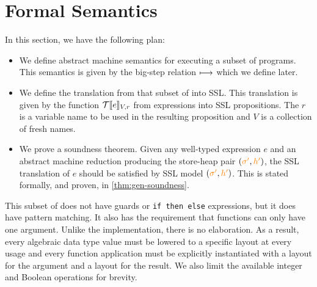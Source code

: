 \section{Formal Semantics}
\label{sec:semantics}



In this section, we have the following plan:

\begin{itemize}
  \item We define abstract machine semantics for executing a subset of \tool programs. This semantics
    is given by the big-step relation $\longmapsto$ which we define later.
  \item We define the translation from that subset of \tool into SSL. This translation is given by the
    function $\mathcal{T}\llbracket e\rrbracket_{V,r}$ from \tool expressions into SSL propositions. The $r$ is a variable name to
    be used in the resulting proposition and $V$ is a collection of fresh names.
  \item We prove a soundness theorem. Given any well-typed expression $e$ and an abstract machine reduction producing
    the store-heap pair $({\color{orange} \sigma'}, {\color{orange} h'})$, the SSL translation of $e$ should be satisfied by SSL model $({\color{orange} \sigma'}, {\color{orange} h'})$. This is stated formally, and proven,
    in \autoref{thm:gen-soundness}.
\end{itemize}

This subset of \tool does not have guards or \lstinline[language=Pika]{if then else} expressions, but it does have pattern
matching. It also has the requirement that functions can only have one argument. Unlike the implementation, there
is no elaboration. As a result, every algebraic data type value must be lowered to a specific layout at every usage
and every function application must be explicitly instantiated with a layout for the argument and a layout for the result. We
also limit the available integer and Boolean operations for brevity.

